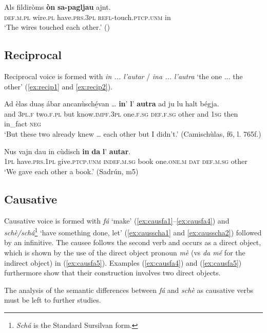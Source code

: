 \ea\label{ex:refvaj3}
\gll   Als fildiròms \textbf{òn} \textbf{sa-pagljau} ajnt.\\
    \textsc{def.m.pl} wire.\textsc{pl} have.\textsc{prs.3pl} \textsc{refl}-touch.\textsc{ptcp.unm} in \\
\glt `The wires touched each other.' ()
\z


\subsection{Reciprocal}
Reciprocal voice is formed with \textit{in ... l'autar} / \textit{ina ... l'autra} `the one ... the other' (\ref{ex:recip1} and \ref{ex:recip2}).

\ea
\label{ex:recip1}
\gll    Ad èlas duaṣ ábar ancanùsché̱van … \textbf{in}’ \textbf{l}’ \textbf{autra} ad ju lu halt bégja.\\
and \textsc{3pl.f} two.\textsc{f.pl} but know.\textsc{impf.3pl} {} one.\textsc{f.sg}  \textsc{def.f.sg} other and \textsc{1sg} then in\_fact \textsc{neg}\\
\glt `But these two already knew … each other but I didn’t.' (Camischùlas, f6, l. 765f.)
\z

\ea
\label{ex:recip2}
\gll Nus vajn dau in cùdisch \textbf{in} \textbf{da} \textbf{l}' \textbf{autar}.\\
\textsc{1pl} have.\textsc{prs.1pl} give.\textsc{ptcp.unm} \textsc{indef.m.sg} book one.\textsc{one.m} \textsc{dat} \textsc{def.m.sg} other\\
\glt `We gave each other a book.' (Sadrún, m5)
\z

\subsection{Causative}
Causative voice is formed with \textit{fá} ‘make’ (\ref{ex:causfa1}--\ref{ex:causfa4}) and \textit{schè/schá}\footnote{\textit{Schá} is the Standard Sursilvan form.} `have something done, let' (\ref{ex:causscha1} and \ref{ex:causscha2}) followed by an infinitive. The causee follows the second verb and occurs as a direct object, which is shown by the use of the direct object pronoun \textit{mè} (vs\textit{ da mé} for the indirect object) in (\ref{ex:causfa5}). Examples (\ref{ex:causfa4}) and (\ref{ex:causfa5}) furthermore show that their construction involves two direct objects.

The analysis of the semantic differences between \textit{fá} and \textit{schè} as causative verbs must be left to further studies.

